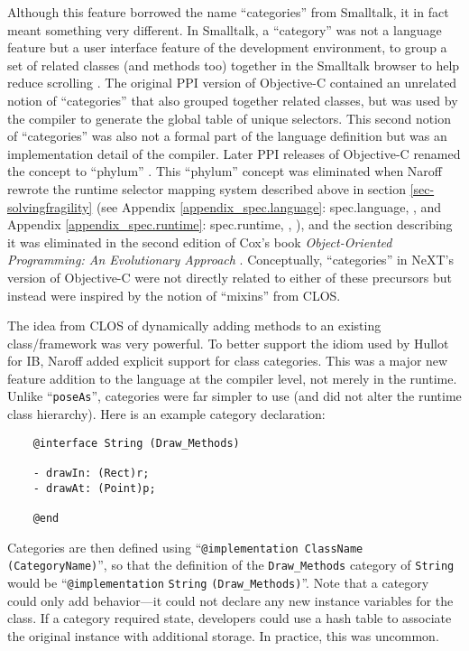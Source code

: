 \documentclass[acmsmall]{acmart}\settopmatter{}
\begin{document}
Although this feature borrowed the name ``categories'' from Smalltalk, it in fact meant something very different. In Smalltalk, a ``category'' was not a language feature but a user interface feature of the development environment, to group a set of related classes (and methods too) together in the Smalltalk browser to help reduce scrolling \citetext{\citealp[122, 124]{tesler_smalltalk_1981}; \citealp[18]{tesler_oral_2013}}. The original PPI version of Objective-C contained an unrelated notion of ``categories'' that also grouped together related classes, but was used by the compiler to generate the global table of unique selectors. This second notion of ``categories'' was also not a formal part of the language definition but was an implementation detail of the compiler. Later PPI releases of Objective-C renamed the concept to ``phylum'' \citetext{\citealp[84--88]{cox_object-oriented_1986}, see also Appendix \ref{appendix_spec.runtime}: spec.runtime, }. This ``phylum'' concept was eliminated when Naroff rewrote the runtime selector mapping system described above in section \ref{sec-solvingfragility} (see Appendix \ref{appendix_spec.language}: spec.language, , and Appendix \ref{appendix_spec.runtime}: spec.runtime, , ), and the section describing it was eliminated in the second edition of Cox's book \emph{Object-Oriented Programming: An Evolutionary Approach} \citep[88--89]{cox_object-oriented_1991}. Conceptually, ``categories'' in NeXT's version of Objective-C were not directly related to either of these precursors but instead were inspired by the notion of ``mixins'' from CLOS.

The idea from CLOS of dynamically adding methods to an existing class/framework was very powerful. To better support the idiom used by Hullot for IB, Naroff added explicit support for class categories. This was a major new feature addition to the language at the compiler level, not merely in the runtime. Unlike ``\verb$poseAs$'', categories were far simpler to use (and did not alter the runtime class hierarchy). Here is an example category declaration:
\begin{verbatim}
    @interface String (Draw_Methods)

    - drawIn: (Rect)r; 
    - drawAt: (Point)p; 

    @end
\end{verbatim}
Categories are then defined using ``\verb$@implementation ClassName (CategoryName)$'', so that the definition of the \verb$Draw_Methods$ category of \verb$String$ would be ``\verb$@implementation$ \verb$String$ \verb$(Draw_Methods)$''. Note that a category could only add behavior---it could not declare any new instance variables for the class. If a category required state, developers could use a hash table to associate the original instance with additional storage. In practice, this was uncommon.
\end{document}
